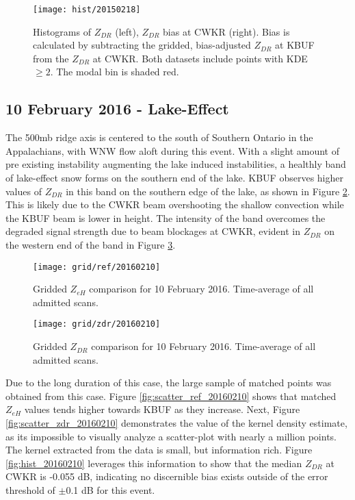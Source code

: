\begin{figure}[H]
\texttt{[image: hist/20150218]}\centering
\caption{Histograms of $Z_{DR}$ (left), $Z_{DR}$ bias at CWKR (right). Bias is calculated by subtracting the gridded, bias-adjusted $Z_{DR}$ at KBUF from the
$Z_{DR}$ at CWKR. Both datasets include points with KDE $\geq 2$. The modal bin is shaded red.} 
\label{fig:hist_20150218}
\end{figure}

\subsection{10 February 2016 - Lake-Effect}
The 500mb ridge axis is centered to the south of Southern Ontario in the Appalachians, with WNW flow aloft during this event. With a slight amount of pre
existing instability augmenting the lake induced instabilities, a healthly band of lake-effect snow forms on the southern end of the lake. KBUF observes
higher values of $Z_{DR}$ in this band on the southern edge of the lake, as shown in Figure \ref{fig:grid_ref_20160210}. This is likely due to the CWKR beam
overshooting the shallow convection while the KBUF beam is lower in height. The intensity of the band overcomes the degraded signal strength due to beam
blockages at CWKR, evident in $Z_{DR}$ on the western end of the band in Figure \ref{fig:grid_zdr_20160210}. 
\begin{figure}[H]
\texttt{[image: grid/ref/20160210]}
\caption{Gridded $Z_{eH}$ comparison for 10 February 2016. Time-average of all admitted scans.} 
\label{fig:grid_ref_20160210}
\end{figure}

\begin{figure}[H]
\texttt{[image: grid/zdr/20160210]}
\caption{Gridded $Z_{DR}$ comparison for 10 February 2016. Time-average of all admitted scans.} 
\label{fig:grid_zdr_20160210}
\end{figure}

\vspace{5mm}

Due to the long duration of this case, the large
sample of matched points was obtained from this case. Figure \ref{fig:scatter_ref_20160210} shows that matched $Z_{eH}$ values tends higher towards KBUF as
they increase. Next, Figure \ref{fig:scatter_zdr_20160210} demonstrates the value of the kernel density estimate, as its impossible to visually analyze a
scatter-plot with nearly a million points. The kernel extracted from the data is small, but information rich. Figure \ref{fig:hist_20160210} leverages this
information to show that the median $Z_{DR}$ at CWKR is -0.055 dB, indicating no discernible bias exists outside of the error threshold of $\pm$0.1 dB for
this event.

